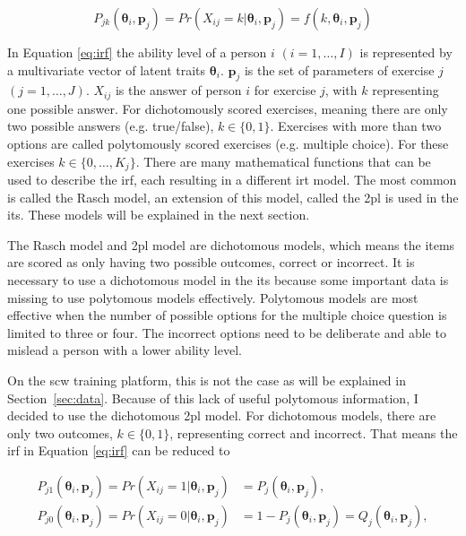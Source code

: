 \begin{equation}
    \label{eq:irf}
    P_{jk}(\bm{\theta}_i,\bm{p}_j) = Pr(X_{ij} = k | \bm{\theta}_i,\bm{p}_j) = f(k,\bm{\theta}_i,\bm{p}_j)
\end{equation}

In Equation \ref{eq:irf} the ability level of a person $i$ $(i = 1,\dots,I)$ is represented by a multivariate vector of latent traits $\bm{\theta}_i$. $\bm{p}_j$ is the set of parameters of exercise $j$ $(j = 1,\dots,J)$. $X_{ij}$ is the answer of person $i$ for exercise $j$, with $k$ representing one possible answer. 
For dichotomously scored exercises, meaning there are only two possible answers (e.g. true/false), $k \in \{0,1\}$.
Exercises with more than two options are called polytomously scored exercises (e.g. multiple choice).
For these exercises $k \in \{0,\dots,K_j\}$. 
There are many mathematical functions that can be used to describe the \gls{irf}, each resulting in a different \gls{irt} model.
The most common is called the Rasch model, an extension of this model, called the \gls{2pl} is used in the \gls{its}.
These models will be explained in the next section.

The Rasch model and \gls{2pl} model are dichotomous models, which means the items are scored as only having two possible outcomes, correct or incorrect.
It is necessary to use a dichotomous model in the \gls{its} because some important data is missing to use polytomous models effectively.
Polytomous models are most effective when the number of possible options for the multiple choice question is limited to three or four. 
The incorrect options need to be deliberate and able to mislead a person with a lower ability level. 

On the \gls{scw} training platform, this is not the case as will be explained in Section~\ref{sec:data}.
Because of this lack of useful polytomous information, I decided to use the dichotomous \gls{2pl} model.
For dichotomous models, there are only two outcomes, $k \in \{0,1\}$, representing correct and incorrect.
That means the \gls{irf} in Equation \ref{eq:irf} can be reduced to

\begin{subequations}
\label{eq:irf-dicho}
\begin{align}
        P_{j1}(\bm{\theta}_i,\bm{p}_j) = Pr(X_{ij} = 1 | \bm{\theta}_i,\bm{p}_j) &= P_{j}(\bm{\theta}_i,\bm{p}_j) ,         \label{eq:irf-dicho1} \\
        P_{j0}(\bm{\theta}_i,\bm{p}_j) = Pr(X_{ij} = 0 | \bm{\theta}_i,\bm{p}_j)
        &= 1 - P_{j}(\bm{\theta}_i,\bm{p}_j)
        = Q_{j}(\bm{\theta}_i,\bm{p}_j) ,         \label{eq:irf-dicho2}
\end{align}
\end{subequations}

